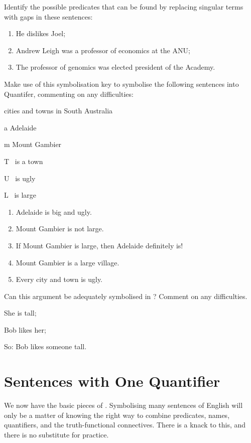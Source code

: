 \problempart Identify the possible predicates that can be found by replacing singular terms with gaps in these sentences: \begin{enumerate}
	\item He dislikes Joel;
	\item Andrew Leigh was a professor of economics at the ANU;
	\item The professor of genomics was elected president of the Academy.
\end{enumerate}


\problempart
Make use of this symbolisation key to symbolise the following sentences into Quantifer, commenting on any difficulties:
\begin{ekey}
		\item[\text{domain}] cities and towns in South Australia
		\item[a] Adelaide
		\item[m] Mount Gambier
		\item[T] \blank\ is a town
		\item[U] \blank\ is ugly
		\item[L] \blank\ is large
	\end{ekey}

\begin{enumerate}
	\item Adelaide is big and ugly.
	\item Mount Gambier is not large.
	\item If Mount Gambier is large, then Adelaide definitely is!
	\item Mount Gambier is a large village.
	\item Every city and town is ugly.
\end{enumerate}

\problempart Can this argument be adequately symbolised in \FOL? Comment on any difficulties. \begin{earg}
	\item She is tall;
	\item Bob likes her;
	\item[So:] Bob likes someone tall. 
\end{earg}

\chapter{Sentences with One Quantifier}\label{s:MoreMonadic}
We now have the basic pieces of \FOL. Symbolising many sentences of English will only be a matter of knowing the right way to combine predicates, names, quantifiers, and the truth-functional connectives. There is a knack to this, and there is no substitute for practice.



